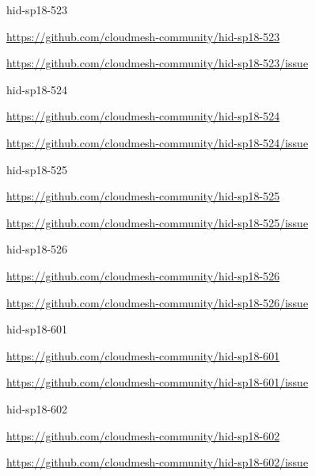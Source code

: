 \begin{IU}

hid-sp18-523

\url{https://github.com/cloudmesh-community/hid-sp18-523}

\url{https://github.com/cloudmesh-community/hid-sp18-523/issue}

\end{IU}


\begin{IU}

hid-sp18-524

\url{https://github.com/cloudmesh-community/hid-sp18-524}

\url{https://github.com/cloudmesh-community/hid-sp18-524/issue}

\end{IU}


\begin{IU}

hid-sp18-525

\url{https://github.com/cloudmesh-community/hid-sp18-525}

\url{https://github.com/cloudmesh-community/hid-sp18-525/issue}

\end{IU}


\begin{IU}

hid-sp18-526

\url{https://github.com/cloudmesh-community/hid-sp18-526}

\url{https://github.com/cloudmesh-community/hid-sp18-526/issue}

\end{IU}


\begin{IU}

hid-sp18-601

\url{https://github.com/cloudmesh-community/hid-sp18-601}

\url{https://github.com/cloudmesh-community/hid-sp18-601/issue}

\end{IU}


\begin{IU}

hid-sp18-602

\url{https://github.com/cloudmesh-community/hid-sp18-602}

\url{https://github.com/cloudmesh-community/hid-sp18-602/issue}

\end{IU}
